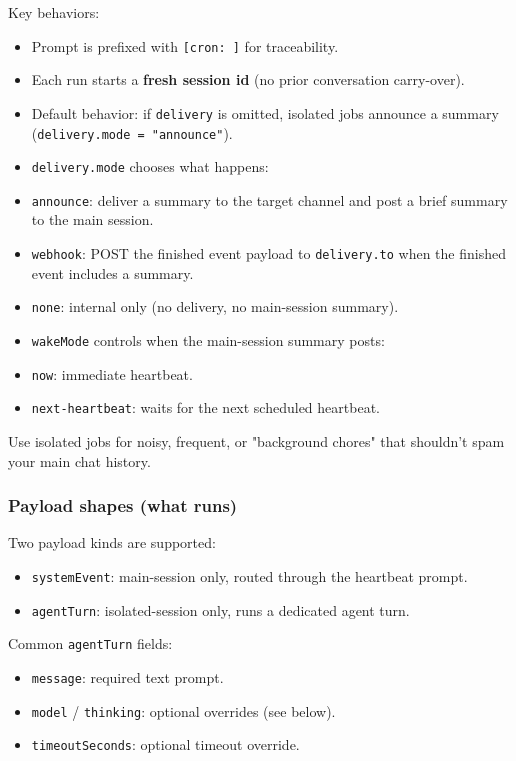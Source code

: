 Key behaviors:

\begin{itemize}
  \item Prompt is prefixed with \texttt{[cron: ]} for traceability.
  \item Each run starts a \textbf{fresh session id} (no prior conversation carry-over).
  \item Default behavior: if \texttt{delivery} is omitted, isolated jobs announce a summary (\texttt{delivery.mode = "announce"}).
  \item \texttt{delivery.mode} chooses what happens:
  \item \texttt{announce}: deliver a summary to the target channel and post a brief summary to the main session.
  \item \texttt{webhook}: POST the finished event payload to \texttt{delivery.to} when the finished event includes a summary.
  \item \texttt{none}: internal only (no delivery, no main-session summary).
  \item \texttt{wakeMode} controls when the main-session summary posts:
  \item \texttt{now}: immediate heartbeat.
  \item \texttt{next-heartbeat}: waits for the next scheduled heartbeat.
\end{itemize}


Use isolated jobs for noisy, frequent, or "background chores" that shouldn't spam
your main chat history.

\subsubsection{Payload shapes (what runs)}


Two payload kinds are supported:

\begin{itemize}
  \item \texttt{systemEvent}: main-session only, routed through the heartbeat prompt.
  \item \texttt{agentTurn}: isolated-session only, runs a dedicated agent turn.
\end{itemize}


Common \texttt{agentTurn} fields:

\begin{itemize}
  \item \texttt{message}: required text prompt.
  \item \texttt{model} / \texttt{thinking}: optional overrides (see below).
  \item \texttt{timeoutSeconds}: optional timeout override.
\end{itemize}


